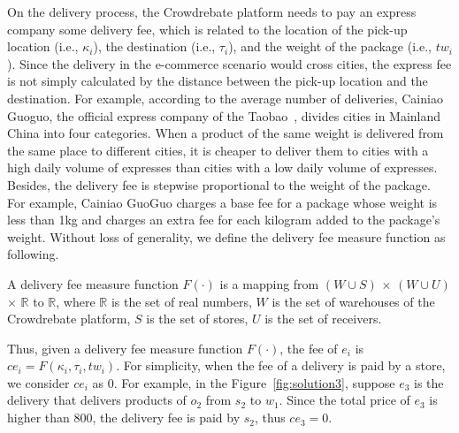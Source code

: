 On the delivery process, the Crowdrebate platform needs to pay an express company some delivery fee, which is related to the location of the pick-up location (i.e., $\kappa_i$), the destination (i.e., $\tau_i$), and the weight of the package (i.e., $tw_i$). Since the delivery in the e-commerce scenario would cross cities, the express fee is not simply calculated by the distance between the pick-up location and the destination. For example, according to the average number of deliveries, Cainiao Guoguo, the official express company of the Taobao~\cite{Taobao}, divides cities in Mainland China into four categories. When a product of the same weight is delivered from the same place to different cities, it is cheaper to deliver them to cities with a high daily volume of expresses than cities with a low daily volume of expresses. Besides, the delivery fee is stepwise proportional to the weight of the package. For example, Cainiao GuoGuo charges a base fee for a package whose weight is less than 1kg and charges an extra fee for each kilogram added to the package's weight. Without loss of generality, we define the delivery fee measure function as following.

\begin{definition}
	A delivery fee measure function $F(\cdot)$ is a mapping from $(W \cup S)$ $\times$ $(W \cup U)$ $\times$ $\mathbb{R}$ to $\mathbb{R}$, where $\mathbb{R}$ is the set of real numbers, $W$ is the set of warehouses of the Crowdrebate platform, $S$ is the set of stores, $U$ is the set of receivers.
\end{definition}

Thus, given a delivery fee measure function $F(\cdot)$, the fee of $e_i$ is $ce_i = F(\kappa_i, \tau_i, tw_i)$. For simplicity, when the fee of a delivery is paid by a store, we consider $ce_i$ as 0. For example, in the Figure~\ref{fig:solution3}, suppose $e_3$ is the delivery that delivers products of $o_2$ from $s_2$ to $w_1$. Since the total price of $e_3$ is higher than 800, the delivery fee is paid by $s_2$, thus $ce_3 = 0$.




